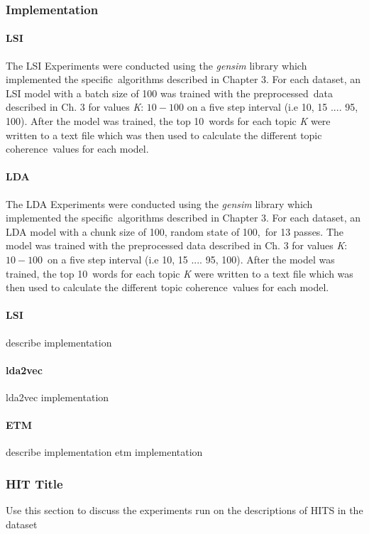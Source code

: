 \documentclass[letterpaper,12pt]{article}
\begin{document}
\subsubsection{Implementation}
\paragraph{LSI}
The LSI Experiments were conducted using the \emph{gensim} library \cite{gensim} which implemented the specific\
algorithms described in Chapter 3. For each dataset, an LSI model with a batch size of 100 was trained with the preprocessed\
data described in Ch. 3 for values \emph{K}: $10 - 100$ on a five step interval (i.e 10, 15 .... 95, 100). After the model was trained, the top 10\
words for each topic \emph{K} were written to a text file which was then used to calculate the different topic coherence\
values for each model.

\paragraph{LDA}
The LDA Experiments were conducted using the \emph{gensim} library \cite{gensim} which implemented the specific\
algorithms described in Chapter 3. For each dataset, an LDA model with a chunk size of 100, random state of 100,\
for 13 passes. The model was trained with the preprocessed data described in Ch. 3 for values \emph{K}: $10 - 100$\
 on a five step interval (i.e 10, 15 .... 95, 100). After the model was trained, the top 10\
words for each topic \emph{K} were written to a text file which was then used to calculate the different topic coherence\
values for each model.

\paragraph{LSI}
describe implementation

\paragraph{lda2vec}
lda2vec implementation \cite{lda2vecGithub}

\paragraph{ETM}
describe implementation 
etm implementation \cite{etmGithub}

\subsubsection{HIT Title}
Use this section to discuss the experiments run on the descriptions of HITS in the dataset
\end{document}
